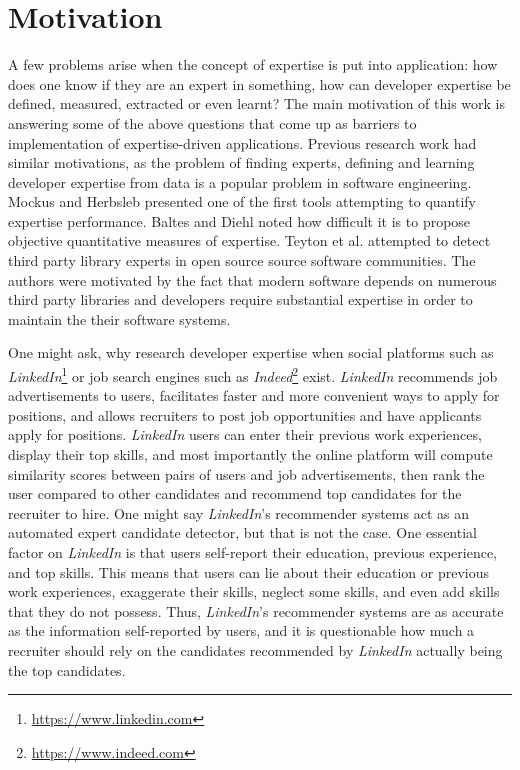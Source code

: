     \section{Motivation\label{sec:motivation}}
        A few problems arise when the concept of expertise is put into application: how does one know if they are an expert in something, how can developer expertise be defined, measured, extracted or even learnt? The main motivation of this work is answering some of the above questions that come up as barriers to implementation of expertise-driven applications. Previous research work had similar motivations, as the problem of finding experts, defining and learning developer expertise from data is a popular problem in software engineering. Mockus and Herbsleb \cite{mockus2002expertise} presented one of the first tools attempting to quantify expertise performance. Baltes and Diehl \cite{baltes2018towards} noted how difficult it is to propose objective quantitative measures of expertise. Teyton et al. \cite{teyton2013find} attempted to detect third party library experts in open source source software communities. The authors were motivated by the fact that modern software depends on numerous third party libraries and developers require substantial expertise in order to maintain the their software systems.
        
        One might ask, why research developer expertise when social platforms such as \emph{LinkedIn}\footnote{\url{https://www.linkedin.com}} or job search engines such as \emph{Indeed}\footnote{\url{https://www.indeed.com}} exist. \emph{LinkedIn} recommends job advertisements to users, facilitates faster and more convenient ways to apply for positions, and allows recruiters to post job opportunities and have applicants apply for positions. \emph{LinkedIn} users can enter their previous work experiences, display their top skills, and most importantly the online platform will compute similarity scores between pairs of users and job advertisements, then rank the user compared to other candidates and recommend top candidates for the recruiter to hire. One might say \emph{LinkedIn}'s recommender systems act as an automated expert candidate detector, but that is not the case. One essential factor on \emph{LinkedIn} is that users self-report their education, previous experience, and top skills. This means that users can lie about their education or previous work experiences, exaggerate their skills, neglect some skills, and even add skills that they do not possess. Thus, \emph{LinkedIn}'s recommender systems are as accurate as the information self-reported by users, and it is questionable how much a recruiter should rely on the candidates recommended by \emph{LinkedIn} actually being the top candidates.
        
